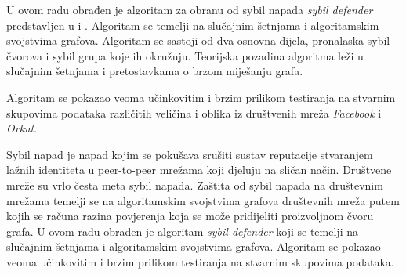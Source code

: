 \documentclass[times, utf8, seminar, numeric]{fer}
\begin{document}
U ovom radu obrađen je algoritam za obranu od sybil napada \textit{sybil defender} predstavljen u \cite{sybil-defender-old} i \cite{sybil-defender}. Algoritam se temelji na slučajnim šetnjama i algoritamskim svojstvima grafova. Algoritam se sastoji od dva osnovna dijela, pronalaska sybil čvorova i sybil grupa koje ih okružuju. Teorijska pozadina algoritma leži u slučajnim šetnjama i pretostavkama o brzom miješanju grafa.

Algoritam se pokazao veoma učinkovitim i brzim prilikom testiranja na stvarnim skupovima podataka različitih veličina i oblika iz društvenih mreža \textit{Facebook} i \textit{Orkut}.




\begin{sazetak}
  Sybil napad je napad kojim se pokušava srušiti sustav reputacije stvaranjem lažnih identiteta u peer-to-peer mrežama koji djeluju na sličan način. Društvene mreže su vrlo česta meta sybil napada. Zaštita od sybil napada na društevnim mrežama temelji se na algoritamskim svojstvima grafova društevnih mreža putem kojih se računa razina povjerenja koja se može pridijeliti proizvoljnom čvoru grafa. U ovom radu obrađen je algoritam \textit{sybil defender} koji se temelji na slučajnim šetnjama i algoritamskim svojstvima grafova. Algoritam se pokazao veoma učinkovitim i brzim prilikom testiranja na stvarnim skupovima podataka.

\end{sazetak}
\end{document}
